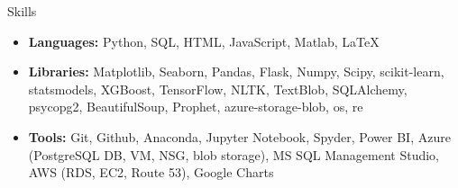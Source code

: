 \documentclass{resume} %
\begin{document}
	\begin{rSection}{Skills}
		\begin{itemize}[leftmargin=0em]
			\item {\bf Languages:}{ Python, SQL, HTML, JavaScript, Matlab, LaTeX}
			\item {\bf Libraries:}{ Matplotlib, Seaborn, Pandas, Flask, Numpy, Scipy, scikit-learn, statsmodels, XGBoost, TensorFlow, NLTK, TextBlob, SQLAlchemy, psycopg2, BeautifulSoup, Prophet, azure-storage-blob, os, re}
			\item {\bf Tools:}{ Git, Github, Anaconda, Jupyter Notebook, Spyder, Power BI, Azure (PostgreSQL DB, VM, NSG, blob storage), MS SQL Management Studio, AWS (RDS, EC2, Route 53), Google Charts }
			
		\end{itemize}
	\end{rSection}
	
\end{document}
